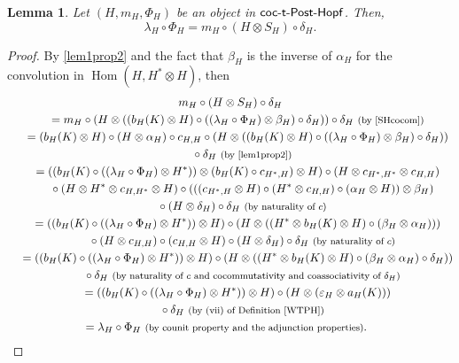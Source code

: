 \documentclass[pdftex]{sigma}
\numberwithin{equation}{section}
\newtheorem{Lemma}[Theorem]{Lemma}
 { \theoremstyle{definition}
\newtheorem{Definition}[Theorem]{Definition}
\newtheorem{Example}[Theorem]{Example}
\newtheorem{Remark}[Theorem]{Remark} }
\DeclareMathOperator{\Hom}{Hom}
\begin{document}
\begin{Lemma}
Let $(H,m_{H},\Phi_{H})$ be an object in $\sf{coc}\textnormal{-}\sf{t}\textnormal{-}\sf{Post}\textnormal{-}\sf{Hopf}$. Then,
\begin{equation}\label{relation lambdaH and SH}
\lambda_{H}\circ\Phi_{H}=m_{H}\circ (H\otimes S_{H})\circ\delta_{H}.
\end{equation}
\end{Lemma}
\begin{proof} By \eqref{lem1prop2} and the fact that $\beta_{H}$ is the inverse of $\alpha_{H}$ for the convolution in $\Hom(H,H^{\ast}\otimes H)$, then
	\begin{gather*}
 m_{H} \circ (H\otimes S_{H})\circ\delta_{H}\\
 \quad{}= m_{H}\circ (H\otimes ((b_{H}(K)\otimes H)\circ ((\lambda_{H}\circ\Phi_{H})\otimes\beta_{H})\circ\delta_{H}))\circ\delta_{H}\ \text{\footnotesize\textnormal{(by \eqref{SHcocom})}}\\
 \quad{}= (b_{H}(K)\otimes H)\circ (H\otimes\alpha_{H})\circ c_{H,H}\circ (H\otimes ((b_{H}(K)\otimes H)\circ ((\lambda_{H}\circ\Phi_{H})\otimes\beta_{H})\circ\delta_{H}))\\
 \qquad{}\circ\delta_{H}\ \text{\footnotesize\textnormal{(by \eqref{lem1prop2})}}\\
 \quad{}= ((b_{H}(K)\circ ((\lambda_{H}\circ \Phi_{H})\otimes H^{\ast}))\otimes (b_{H}(K)\circ c_{H^{\ast},H})\otimes H)\circ (H\otimes c_{H^{\ast},H^{\ast}}\otimes c_{H,H})\\
 \qquad{}\circ (H\otimes H^{\ast}\otimes c_{H,H^{\ast}}\otimes H)\circ (((c_{H^{\ast},H}\otimes H)\circ (H^{\ast}\otimes c_{H,H})\circ (\alpha_{H}\otimes H))\otimes \beta_{H})\\
 \qquad{}\circ (H\otimes\delta_{H})\circ\delta_{H}\ \text{\footnotesize\textnormal{(by naturality of $c$)}}\\
 \quad{}= ((b_{H}(K)\circ ((\lambda_{H}\circ\Phi_{H})\otimes H^{\ast}))\otimes H)\circ (H\otimes ((H^{\ast}\otimes b_{H}(K)\otimes H)\circ (\beta_{H}\otimes\alpha_{H})))\\
 \qquad{}\circ (H\otimes c_{H,H})\circ (c_{H,H}\otimes H)\circ (H\otimes\delta_{H})\circ\delta_{H}\ \text{\footnotesize\textnormal{(by naturality of $c$)}}\\
 \quad{}= ((b_{H}(K)\circ ((\lambda_{H}\circ\Phi_{H})\otimes H^{\ast}))\otimes H)\circ (H\otimes ((H^{\ast}\otimes b_{H}(K)\otimes H)\circ (\beta_{H}\otimes\alpha_{H})\circ\delta_{H}))\\
 \qquad{}\circ\delta_{H}\ \text{\footnotesize\textnormal{(by naturality of $c$ and cocommutativity and coassociativity of $\delta_{H}$)}}\\
 \quad{}= ((b_{H}(K)\circ ((\lambda_{H}\circ\Phi_{H})\otimes H^{\ast}))\otimes H)\circ (H\otimes (\varepsilon_{H}\otimes a_{H}(K)))\\
 \qquad{}\circ\delta_{H}\ \text{\footnotesize\textnormal{(by (vii) of Definition \ref{WTPH})}}\\
 \quad{}= \lambda_{H}\circ\Phi_{H}\ \text{\footnotesize\textnormal{(by counit property and the adjunction properties)}}.\tag*{\qed}
	\end{gather*}
	\renewcommand{\qed}{}
\end{proof}
\end{document}

